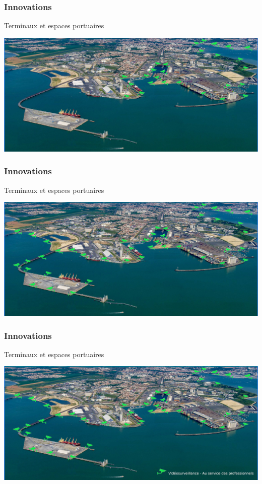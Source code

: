 \begin{frame}
	\frametitle{Innovations}
	Terminaux et espaces portuaires
	\vspace{0.2cm}
	\begin{center}
		\includegraphics[scale=0.35]{images/terminaux_et_espaces_portuaires01.jpg}
	\end{center}
\end{frame}
\begin{frame}
	\frametitle{Innovations}
	Terminaux et espaces portuaires
	\vspace{0.2cm}
	\begin{center}
		\includegraphics[scale=0.35]{images/terminaux_et_espaces_portuaires02.jpg}
	\end{center}
\end{frame}
\begin{frame}
	\frametitle{Innovations}
	Terminaux et espaces portuaires
	\vspace{0.2cm}
	\begin{center}
		\includegraphics[scale=0.35]{images/terminaux_et_espaces_portuaires03.jpg}
	\end{center}
\end{frame}
